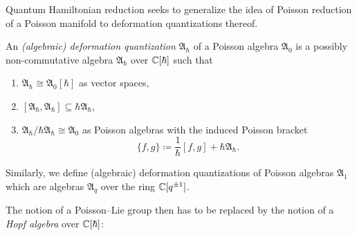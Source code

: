 Quantum Hamiltonian reduction seeks to generalize the idea of Poisson reduction of a Poisson manifold to deformation quantizations thereof.

\begin{definition}
	An \emph{(algebraic) deformation quantization} $\mathfrak{A}_\hbar$ of a Poisson algebra $\mathfrak{A}_0$ is a possibly non-commutative algebra $\mathfrak{A}_\hbar$ over $\mathbb{C}[\hbar]$ such that
	\begin{enumerate}[label=(\roman*)]
		\item $\mathfrak{A}_\hbar \cong \mathfrak{A}_0[\hbar]$ as vector spaces,
		\item $[\mathfrak{A}_\hbar,\mathfrak{A}_\hbar] \subseteq \hbar \mathfrak{A}_\hbar$,
		\item $\mathfrak{A}_\hbar/\hbar \mathfrak{A}_\hbar \cong \mathfrak{A}_0$ as Poisson algebras with the induced Poisson bracket
\begin{equation}
	\{ f, g \} \coloneq \frac{1}{\hbar} [f,g] + \hbar \mathfrak{A}_\hbar.
\end{equation}
	\end{enumerate}
\end{definition}

\begin{remark}
	Similarly, we define (algebraic) deformation quantizations of Poisson algebras $\mathfrak{A}_1$ which are algebras $\mathfrak{A}_q$ over the ring $\mathbb{C}[q^{\pm 1}]$.
\end{remark}

The notion of a Poisson--Lie group then has to be replaced by the notion of a \emph{Hopf algebra} over $\mathbb{C}[\hbar]$:

